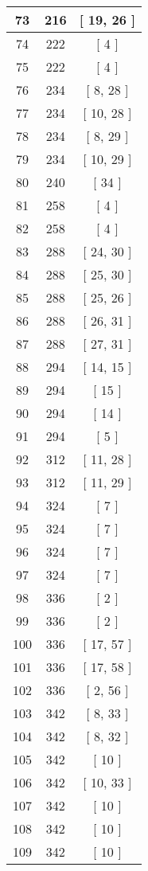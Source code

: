 \begin{center}
\begin{longtable}[H]{|| c c c ||}
\hline
73 & 216 & [ 19, 26 ] \\ 
\hline
74 & 222 & [ 4 ] \\ 
\hline
75 & 222 & [ 4 ] \\ 
\hline
76 & 234 & [ 8, 28 ] \\ 
\hline
77 & 234 & [ 10, 28 ] \\ 
\hline
78 & 234 & [ 8, 29 ] \\ 
\hline
79 & 234 & [ 10, 29 ] \\ 
\hline
80 & 240 & [ 34 ] \\ 
\hline
81 & 258 & [ 4 ] \\ 
\hline
82 & 258 & [ 4 ] \\ 
\hline
83 & 288 & [ 24, 30 ] \\ 
\hline
84 & 288 & [ 25, 30 ] \\ 
\hline
85 & 288 & [ 25, 26 ] \\ 
\hline
86 & 288 & [ 26, 31 ] \\ 
\hline
87 & 288 & [ 27, 31 ] \\ 
\hline
88 & 294 & [ 14, 15 ] \\ 
\hline
89 & 294 & [ 15 ] \\ 
\hline
90 & 294 & [ 14 ] \\ 
\hline
91 & 294 & [ 5 ] \\ 
\hline
92 & 312 & [ 11, 28 ] \\ 
\hline
93 & 312 & [ 11, 29 ] \\ 
\hline
94 & 324 & [ 7 ] \\ 
\hline
95 & 324 & [ 7 ] \\ 
\hline
96 & 324 & [ 7 ] \\ 
\hline
97 & 324 & [ 7 ] \\ 
\hline
98 & 336 & [ 2 ] \\ 
\hline
99 & 336 & [ 2 ] \\ 
\hline
100 & 336 & [ 17, 57 ] \\ 
\hline
101 & 336 & [ 17, 58 ] \\ 
\hline
102 & 336 & [ 2, 56 ] \\ 
\hline
103 & 342 & [ 8, 33 ] \\ 
\hline
104 & 342 & [ 8, 32 ] \\ 
\hline
105 & 342 & [ 10 ] \\ 
\hline
106 & 342 & [ 10, 33 ] \\ 
\hline
107 & 342 & [ 10 ] \\ 
\hline
108 & 342 & [ 10 ] \\ 
\hline
109 & 342 & [ 10 ] \\ 

\end{longtable}
\end{center}
